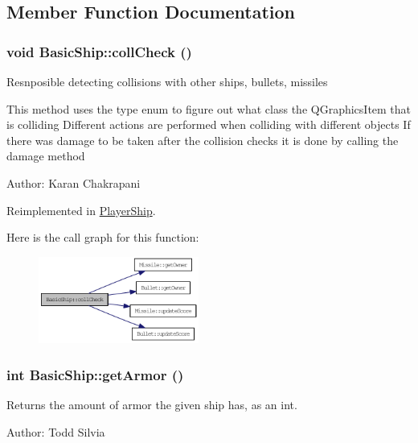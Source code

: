 \subsection{Member Function Documentation}
\hypertarget{class_basic_ship_a30787afde7d49a62891c1b9e73e9b7d9}{
\subsubsection[{collCheck}]{\setlength{\rightskip}{0pt plus 5cm}void BasicShip::collCheck ()}}
\label{class_basic_ship_a30787afde7d49a62891c1b9e73e9b7d9}
Resnposible detecting collisions with other ships, bullets, missiles

This method uses the type enum to figure out what class the QGraphicsItem that is colliding Different actions are performed when colliding with different objects If there was damage to be taken after the collision checks it is done by calling the damage method

Author: Karan Chakrapani 

Reimplemented in \hyperlink{class_player_ship_a9c3745489576a8c3027b9e17ac2046fb}{PlayerShip}.

Here is the call graph for this function:\nopagebreak
\begin{figure}[H]
\begin{center}
\leavevmode
\includegraphics[width=149pt]{class_basic_ship_a30787afde7d49a62891c1b9e73e9b7d9_cgraph}
\end{center}
\end{figure}
\hypertarget{class_basic_ship_a54134d4fe367db9649ffb4bd6a1123b7}{
\subsubsection[{getArmor}]{\setlength{\rightskip}{0pt plus 5cm}int BasicShip::getArmor ()}}
\label{class_basic_ship_a54134d4fe367db9649ffb4bd6a1123b7}
Returns the amount of armor the given ship has, as an int.

Author: Todd Silvia 

